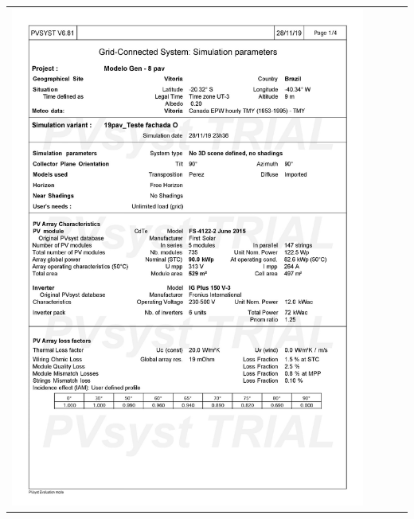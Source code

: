 \begin{table}[H]
    \centering
    \begin{tabular}{l}
        \includegraphics[width=0.9\textwidth]{figures/attachments/resultpv27.jpg}
    \end{tabular}
\end{table}
\pagebreak
